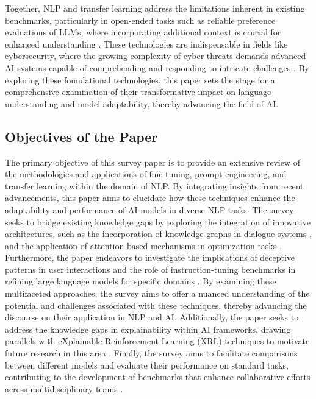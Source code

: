 Together, NLP and transfer learning address the limitations inherent in existing benchmarks, particularly in open-ended tasks such as reliable preference evaluations of LLMs, where incorporating additional context is crucial for enhanced understanding \cite{ghosh2024comparedespairreliablepreference}. These technologies are indispensable in fields like cybersecurity, where the growing complexity of cyber threats demands advanced AI systems capable of comprehending and responding to intricate challenges \cite{m2023comparativeanalysisimbalancedmalware}. By exploring these foundational technologies, this paper sets the stage for a comprehensive examination of their transformative impact on language understanding and model adaptability, thereby advancing the field of AI.



\subsection{Objectives of the Paper} \label{subsec:Objectives of the Paper}



The primary objective of this survey paper is to provide an extensive review of the methodologies and applications of fine-tuning, prompt engineering, and transfer learning within the domain of NLP. By integrating insights from recent advancements, this paper aims to elucidate how these techniques enhance the adaptability and performance of AI models in diverse NLP tasks. The survey seeks to bridge existing knowledge gaps by exploring the integration of innovative architectures, such as the incorporation of knowledge graphs in dialogue systems \cite{chaudhuri2021groundingdialoguesystemsknowledge}, and the application of attention-based mechanisms in optimization tasks \cite{lange2023discoveringattentionbasedgeneticalgorithms}. Furthermore, the paper endeavors to investigate the implications of deceptive patterns in user interactions \cite{benharrak2024deceptivepatternsintelligentinteractive} and the role of instruction-tuning benchmarks in refining large language models for specific domains \cite{li2023ecomgptinstructiontuninglargelanguage}. By examining these multifaceted approaches, the survey aims to offer a nuanced understanding of the potential and challenges associated with these techniques, thereby advancing the discourse on their application in NLP and AI. Additionally, the paper seeks to address the knowledge gaps in explainability within AI frameworks, drawing parallels with eXplainable Reinforcement Learning (XRL) techniques to motivate future research in this area \cite{qing2023surveyexplainablereinforcementlearning}. Finally, the survey aims to facilitate comparisons between different models and evaluate their performance on standard tasks, contributing to the development of benchmarks that enhance collaborative efforts across multidisciplinary teams .



